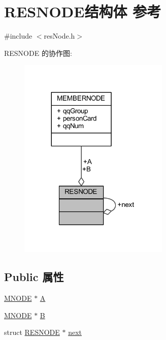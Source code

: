 \hypertarget{struct_r_e_s_n_o_d_e}{}\section{R\+E\+S\+N\+O\+D\+E结构体 参考}
\label{struct_r_e_s_n_o_d_e}


{\ttfamily \#include $<$res\+Node.\+h$>$}



R\+E\+S\+N\+O\+DE 的协作图\+:
\nopagebreak
\begin{figure}[H]
\begin{center}
\leavevmode
\includegraphics[width=203pt]{struct_r_e_s_n_o_d_e__coll__graph}
\end{center}
\end{figure}
\subsection*{Public 属性}
\begin{DoxyCompactItemize}
\item 
\hyperlink{_member_node_8h_af952c400512f5ff05a9356b68cb15730}{M\+N\+O\+DE} $\ast$ \hyperlink{struct_r_e_s_n_o_d_e_a51a4dc6b4f237be6b7668edec10f54c9}{A}
\item 
\hyperlink{_member_node_8h_af952c400512f5ff05a9356b68cb15730}{M\+N\+O\+DE} $\ast$ \hyperlink{struct_r_e_s_n_o_d_e_a7f54a8463ffa2e0e459aaf2de9beee47}{B}
\item 
struct \hyperlink{struct_r_e_s_n_o_d_e}{R\+E\+S\+N\+O\+DE} $\ast$ \hyperlink{struct_r_e_s_n_o_d_e_a76de7271a9ebedfb82e49bab978d3dd5}{next}
\end{DoxyCompactItemize}


